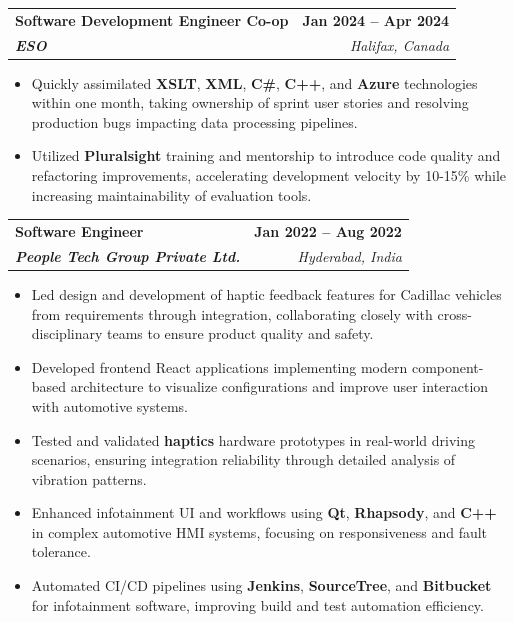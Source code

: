 \documentclass[letterpaper,11pt]{article}
\makeatletter
\newcommand{\resumeItem}[1]{
  \item\small{
    {#1 \vspace{-2pt}}
  }
}
\newcommand{\resumeSubheading}[4]{
  \vspace{-2pt}\item
    \begin{tabular*}{1.0\textwidth}[t]{l@{\extracolsep{\fill}}r}
      \textbf{#1} & \textbf{\small #2} \\
      \textit{\small#3} & \textit{\small #4} \\
    \end{tabular*}\vspace{-7pt}
}
\newcommand{\resumeItemListStart}{\begin{itemize}}
\newcommand{\resumeItemListEnd}{\end{itemize}\vspace{-5pt}}
\makeatother
\begin{document}
    \resumeSubheading
      {\textbf{Software Development Engineer Co-op}}{\textbf{Jan 2024 -- Apr 2024}}
      {\textbf{ESO}}{Halifax, Canada}
      \resumeItemListStart
        \resumeItem{Quickly assimilated \textbf{XSLT}, \textbf{XML}, \textbf{C\#}, \textbf{C++}, and \textbf{Azure} technologies within one month, taking ownership of sprint user stories and resolving production bugs impacting data processing pipelines.}
        \resumeItem{Utilized \textbf{Pluralsight} training and mentorship to introduce code quality and refactoring improvements, accelerating development velocity by 10-15\% while increasing maintainability of evaluation tools.}
      \resumeItemListEnd

    \resumeSubheading
      {\textbf{Software Engineer}}{\textbf{Jan 2022 -- Aug 2022}}
      {\textbf{People Tech Group Private Ltd.}}{Hyderabad, India}
      \resumeItemListStart
        \resumeItem{Led design and development of haptic feedback features for Cadillac vehicles from requirements through integration, collaborating closely with cross-disciplinary teams to ensure product quality and safety.}
        \resumeItem{Developed frontend React applications implementing modern component-based architecture to visualize configurations and improve user interaction with automotive systems.}
        \resumeItem{Tested and validated \textbf{haptics} hardware prototypes in real-world driving scenarios, ensuring integration reliability through detailed analysis of vibration patterns.}
        \resumeItem{Enhanced infotainment UI and workflows using \textbf{Qt}, \textbf{Rhapsody}, and \textbf{C++} in complex automotive HMI systems, focusing on responsiveness and fault tolerance.}
        \resumeItem{Automated CI/CD pipelines using \textbf{Jenkins}, \textbf{SourceTree}, and \textbf{Bitbucket} for infotainment software, improving build and test automation efficiency.}
      \resumeItemListEnd
\end{document}
